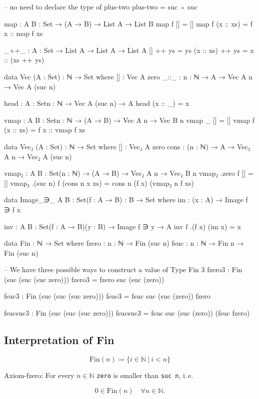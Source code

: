 \begin{code}
-- no need to declare the type of plus-two
plus-two = suc ◦ suc

map : {A B : Set} → (A → B) → List A → List B
map f        [] = []
map f (x :: xs) = f x :: map f xs

_++_ : {A : Set} → List A → List A → List A
[]        ++ ys = ys
(x :: xs) ++ ys = x :: (xs ++ ys)

data Vec (A : Set) : ℕ → Set where
  [] : Vec A zero
  _::_ : {n : ℕ} → A → Vec A n → Vec A (suc n)

head : {A : Set}{n : ℕ} → Vec A (suc n) → A
head (x :: _) = x

vmap : {A B : Set}{n : ℕ} → (A → B) → Vec A n → Vec B n
vmap _        [] = []
vmap f (x :: xs) = f x :: vmap f xs

data Vec₂ (A : Set) : ℕ → Set where
  [] : Vec₂ A zero
  cons : (n : ℕ) → A → Vec₂ A n → Vec₂ A (suc n)

vmap₂ : {A B : Set}(n : ℕ) → (A → B) → Vec₂ A n → Vec₂ B n
vmap₂ .zero f [] = []
vmap₂ .(suc n) f (cons n x xs) = cons n (f x) (vmap₂ n f xs)

data Image_∋_ {A B : Set}(f : A → B) : B → Set where
  im : (x : A) → Image f ∋ f x

inv : {A B : Set}(f : A → B)(y : B) → Image f ∋ y → A
inv f .(f x) (im x) = x

data Fin : ℕ → Set where
  fzero : {n : ℕ} → Fin (suc n)
  fsuc : {n : ℕ} → Fin n → Fin (suc n)

-- We have three possible ways to construct a value of Type Fin 3
fzero3 : Fin (suc (suc (suc zero)))
fzero3 = fzero {suc (suc (zero))}

fsuc3 : Fin (suc (suc (suc zero)))
fsuc3 = fsuc {suc (suc (zero))} fzero

fsucsuc3 : Fin (suc (suc (suc zero)))
fsucsuc3 = fsuc {suc (suc (zero))} (fsuc fzero)
\end{code}

\subsection{Interpretation of Fin}
\begin{equation*}
\text{Fin}(n) ≔ \{ i ∈ ℕ ~|~ i < n \}
\end{equation*}

Axiom-fzero: For every $n ∈ ℕ$ \verb+zero+ is smaller than \verb+suc n+, i. e.

\begin{equation*}
0 ∈ \text{Fin}(n) \quad ∀ n ∈ ℕ.
\end{equation*}

